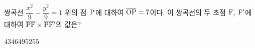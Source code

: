 쌍곡선 $\dfrac{x^2}{9}-\dfrac{y^2}{9}=1$ 위의 점~$\mathrm{P}$에 대하여 $\overline{\mathrm{OP}}=7$이다. 이 쌍곡선의 두 초점 $\mathrm{F}$, $\mathrm{F}'$에 대하여 $\overline{\mathrm{PF}}\times\overline{\mathrm{PF'}}$의 값은? 
\begin{choices32}{$43$}{$46$}{$49$}{$52$}{$55$}\end{choices32}
